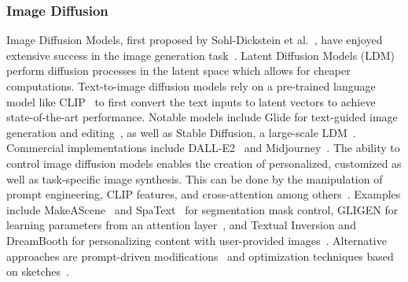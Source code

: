 \subsubsection{Image Diffusion}
Image Diffusion Models, first proposed by Sohl-Dickstein et al.~\cite{sohldickstein2015deepunsupervisedlearningusing}, 
have enjoyed extensive success in the image generation task~\cite{dhariwal2021diffusionmodelsbeatgans, kingma2023variationaldiffusionmodels}. 
Latent Diffusion Models (LDM)~\cite{rombach2022stablediffusion} perform diffusion processes 
in the latent space which allows for cheaper computations. Text-to-image diffusion models rely 
on a pre-trained language model like CLIP~\cite{radford2021learningtransferablevisualmodels} 
to first convert the text inputs to latent vectors to achieve state-of-the-art performance. 
Notable models include Glide for text-guided image generation and editing~\cite{nichol2022glidephotorealisticimagegeneration}, 
as well as Stable Diffusion, a large-scale LDM~\cite{rombach2022stablediffusion}. Commercial 
implementations include DALL-E2~\cite{2023dalle2} and Midjourney~\cite{2023midjourney}. 
The ability to control image diffusion models enables the creation of personalized, customized
as well as task-specific image synthesis. This can be done by the manipulation of prompt 
engineering, CLIP features, and cross-attention among others~\cite{parmar2023zeroshotimagetoimagetranslation, gafni2022makeascenescenebasedtexttoimagegeneration}. 
Examples include MakeAScene~\cite{gafni2022makeascenescenebasedtexttoimagegeneration} and 
SpaText~\cite{Avrahami_2023} for segmentation mask control, GLIGEN for 
learning parameters from an attention layer~\cite{li2023gligenopensetgroundedtexttoimage}, 
and Textual Inversion and DreamBooth for personalizing content with user-provided images~\cite{gal2022imageworthwordpersonalizing, ruiz2023dreamboothfinetuningtexttoimage}. 
Alternative approaches are prompt-driven modifications~\cite{brooks2023instructpix2pixlearningfollowimage, huang2023regionawarediffusionzeroshottextdriven, tumanyan2022plugandplaydiffusionfeaturestextdriven} 
and optimization techniques based on sketches~\cite{voynov2022sketchguidedtexttoimagediffusionmodels}.

